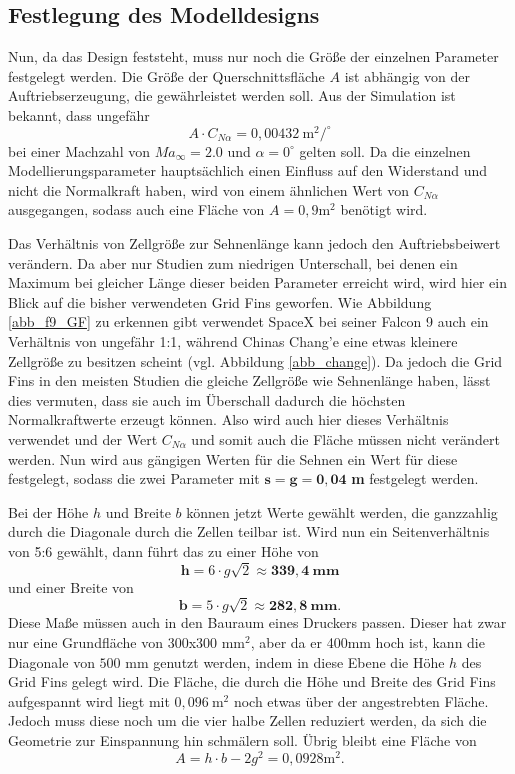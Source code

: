 \subsection{Festlegung des Modelldesigns}\label{sec:modelldesign}
Nun, da das Design feststeht, muss nur noch die Größe der einzelnen Parameter festgelegt werden. Die Größe der Querschnittsfläche $A$ ist abhängig von der Auftriebserzeugung, die gewährleistet werden soll. Aus der Simulation ist bekannt, dass ungefähr
\begin{equation}
	A \cdot C_{N\alpha}= 0,00432 \mathrm{\ m}^2/^\circ
\end{equation}
bei einer Machzahl von $Ma_\infty = 2.0$ und $\alpha = 0^\circ$ gelten soll. Da die einzelnen Modellierungsparameter hauptsächlich einen Einfluss auf den Widerstand und nicht die Normalkraft haben, wird von einem ähnlichen Wert von $C_{N\alpha}$ ausgegangen, sodass auch eine Fläche von $A=0,9\mathrm{m}^2$ benötigt wird.

Das Verhältnis von Zellgröße zur Sehnenlänge kann jedoch den Auftriebsbeiwert verändern. Da aber nur Studien zum niedrigen Unterschall, bei denen ein Maximum bei gleicher Länge dieser beiden Parameter erreicht wird, wird hier ein Blick auf die bisher verwendeten Grid Fins geworfen. Wie Abbildung \ref{abb_f9_GF} zu erkennen gibt verwendet SpaceX bei seiner Falcon 9 auch ein Verhältnis von ungefähr 1:1, während Chinas Chang'e eine etwas kleinere Zellgröße zu besitzen scheint (vgl. Abbildung \ref{abb_change}). Da jedoch die Grid Fins in den meisten Studien die gleiche Zellgröße wie Sehnenlänge haben, lässt dies vermuten, dass sie auch im Überschall dadurch die höchsten Normalkraftwerte erzeugt können. Also wird auch hier dieses Verhältnis verwendet und der Wert $C_{N\alpha}$ und somit auch die Fläche müssen nicht verändert werden. Nun wird aus gängigen Werten für die Sehnen ein Wert für diese festgelegt, sodass die zwei Parameter mit $\mathbf{s=g=0,04}$ \textbf{m} festgelegt werden.

Bei der Höhe $h$ und Breite $b$ können jetzt Werte gewählt werden, die ganzzahlig durch die Diagonale durch die Zellen teilbar ist. Wird nun ein Seitenverhältnis von 5:6 gewählt, dann führt das zu einer Höhe von \begin{equation}
	\mathbf{h= }6\cdot g\sqrt{2}\approx \mathbf{339,4\ mm}
\end{equation} 
und einer Breite von 
\begin{equation}
\mathbf{b= }5\cdot g\sqrt{2}\approx \mathbf{282,8\ mm}.
\end{equation}
 Diese Maße müssen auch in den Bauraum eines Druckers passen. Dieser hat zwar nur eine Grundfläche von 300x300 mm$^2$, aber da er 400mm hoch ist, kann die Diagonale von $500$ mm genutzt werden, indem in diese Ebene die Höhe $h$ des Grid Fins gelegt wird. Die Fläche, die durch die Höhe und Breite des Grid Fins aufgespannt wird liegt mit $0,096\mathrm{\ m}^2$ noch etwas über der angestrebten Fläche. Jedoch muss diese noch um die vier halbe Zellen reduziert werden, da sich die Geometrie zur Einspannung hin schmälern soll. Übrig bleibt eine Fläche von \begin{equation}
 	A=h\cdot b-2g^2=0,0928\mathrm{m}^2.
 \end{equation}

